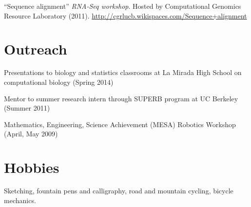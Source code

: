 \documentclass[overlapped]{res}
\begin{document}
\begin{resume}
``Sequence alignment'' {\emph{RNA-Seq workshop}}. Hosted by Computational Genomics Resource Laboratory (2011).  \url{http://cgrlucb.wikispaces.com/Sequence+alignment}

\newpage

\section{\sc Outreach}
Presentations to biology and statistics classrooms at La Mirada High School on
computational biology (Spring 2014)

Mentor to summer research intern through SUPERB program at UC Berkeley (Summer
2011)

Mathematics, Engineering, Science Achievement (MESA) Robotics Workshop
(April, May 2009)
\vspace{-.25cm}

\section{\sc Hobbies}
Sketching, fountain pens and calligraphy, road and mountain cycling, bicycle mechanics.
\end{resume}
\end{document}
